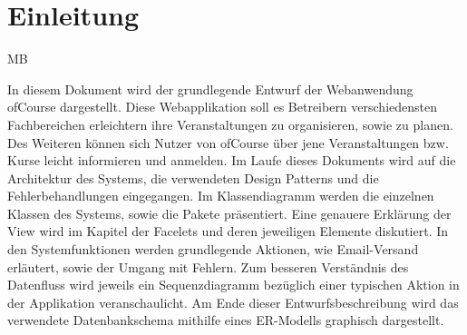 \chapter{Einleitung}
\begin{tiny}
MB \\
\end{tiny}
In diesem Dokument wird der grundlegende Entwurf der Webanwendung \glqq ofCourse\grqq{} dargestellt. Diese Webapplikation soll es Betreibern verschiedensten Fachbereichen erleichtern ihre Veranstaltungen zu organisieren, sowie zu planen. Des Weiteren können sich Nutzer von \glqq ofCourse\grqq{} über jene Veranstaltungen bzw. Kurse leicht informieren und anmelden. Im Laufe dieses Dokuments wird auf die Architektur des Systems, die verwendeten Design Patterns und die Fehlerbehandlungen eingegangen. Im Klassendiagramm werden die einzelnen Klassen des Systems, sowie die Pakete präsentiert. Eine genauere Erklärung der View wird im Kapitel der Facelets und deren jeweiligen Elemente diskutiert. In den Systemfunktionen werden grundlegende Aktionen, wie Email-Versand erläutert, sowie der Umgang mit Fehlern. Zum besseren Verständnis des Datenfluss wird jeweils ein Sequenzdiagramm bezüglich einer typischen Aktion in der Applikation veranschaulicht. 
Am Ende dieser Entwurfsbeschreibung wird das verwendete Datenbankschema mithilfe eines ER-Modells graphisch dargestellt.
